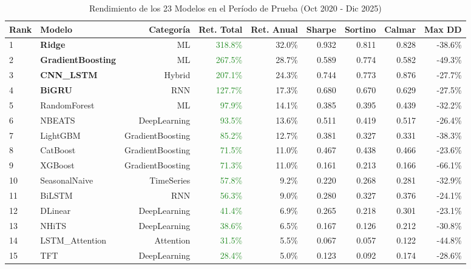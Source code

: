 \begin{table}[htbp]
\centering
\caption{Rendimiento de los 23 Modelos en el Per\'iodo de Prueba (Oct 2020 - Dic 2025)}
\label{tab:model_performance}
\small
\begin{tabular}{@{}llrrrrrrr@{}}
\toprule
\textbf{Rank} & \textbf{Modelo} & \textbf{Categor\'ia} & \textbf{Ret. Total} & \textbf{Ret. Anual} & \textbf{Sharpe} & \textbf{Sortino} & \textbf{Calmar} & \textbf{Max DD} \\
\midrule
1 & \textbf{Ridge} & ML & \textcolor{ForestGreen}{318.8\%} & 32.0\% & 0.932 & 0.811 & 0.828 & -38.6\% \\
2 & \textbf{GradientBoosting} & ML & \textcolor{ForestGreen}{267.5\%} & 28.7\% & 0.589 & 0.774 & 0.582 & -49.3\% \\
3 & \textbf{CNN\_LSTM} & Hybrid & \textcolor{ForestGreen}{207.1\%} & 24.3\% & 0.744 & 0.773 & 0.876 & -27.7\% \\
4 & \textbf{BiGRU} & RNN & \textcolor{ForestGreen}{127.7\%} & 17.3\% & 0.680 & 0.670 & 0.629 & -27.5\% \\
5 & RandomForest & ML & \textcolor{ForestGreen}{97.9\%} & 14.1\% & 0.385 & 0.395 & 0.439 & -32.2\% \\
6 & NBEATS & DeepLearning & \textcolor{ForestGreen}{93.5\%} & 13.6\% & 0.511 & 0.419 & 0.517 & -26.4\% \\
7 & LightGBM & GradientBoosting & \textcolor{ForestGreen}{85.2\%} & 12.7\% & 0.381 & 0.327 & 0.331 & -38.3\% \\
8 & CatBoost & GradientBoosting & \textcolor{ForestGreen}{71.5\%} & 11.0\% & 0.467 & 0.438 & 0.466 & -23.6\% \\
9 & XGBoost & GradientBoosting & \textcolor{ForestGreen}{71.3\%} & 11.0\% & 0.161 & 0.213 & 0.166 & -66.1\% \\
10 & SeasonalNaive & TimeSeries & \textcolor{ForestGreen}{57.8\%} & 9.2\% & 0.220 & 0.268 & 0.281 & -32.9\% \\
11 & BiLSTM & RNN & \textcolor{ForestGreen}{56.3\%} & 9.0\% & 0.280 & 0.327 & 0.376 & -24.1\% \\
12 & DLinear & DeepLearning & \textcolor{ForestGreen}{41.4\%} & 6.9\% & 0.265 & 0.218 & 0.301 & -23.1\% \\
13 & NHiTS & DeepLearning & \textcolor{ForestGreen}{38.6\%} & 6.5\% & 0.167 & 0.126 & 0.212 & -30.8\% \\
14 & LSTM\_Attention & Attention & \textcolor{ForestGreen}{31.5\%} & 5.5\% & 0.067 & 0.057 & 0.122 & -44.8\% \\
15 & TFT & DeepLearning & \textcolor{ForestGreen}{28.4\%} & 5.0\% & 0.123 & 0.092 & 0.174 & -28.6\% \\

\end{tabular}
\end{table}

